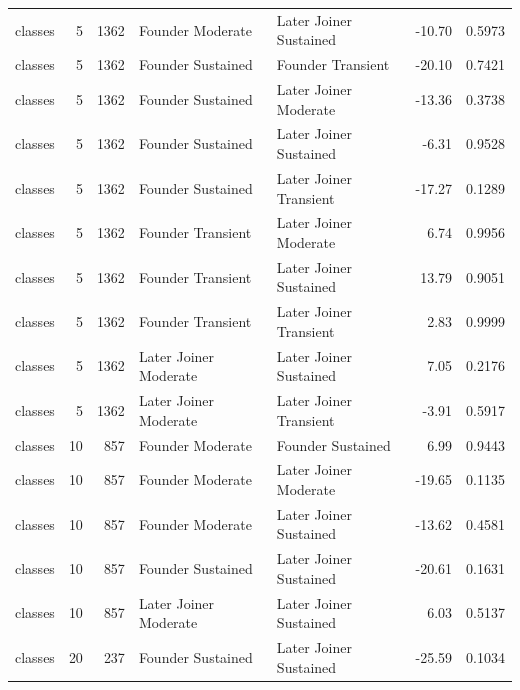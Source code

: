 \begin{table}[H]
{\begin{tabular}{l r r l l r r}
classes & 5 & 1362 & Founder Moderate & Later Joiner Sustained & -10.70 & 0.5973 \\ 
classes & 5 & 1362 & Founder Sustained & Founder Transient & -20.10 & 0.7421 \\ 
classes & 5 & 1362 & Founder Sustained & Later Joiner Moderate & -13.36 & 0.3738 \\ 
classes & 5 & 1362 & Founder Sustained & Later Joiner Sustained & -6.31 & 0.9528 \\ 
classes & 5 & 1362 & Founder Sustained & Later Joiner Transient & -17.27 & 0.1289 \\ 
classes & 5 & 1362 & Founder Transient & Later Joiner Moderate & 6.74 & 0.9956 \\ 
classes & 5 & 1362 & Founder Transient & Later Joiner Sustained & 13.79 & 0.9051 \\ 
classes & 5 & 1362 & Founder Transient & Later Joiner Transient & 2.83 & 0.9999 \\ 
classes & 5 & 1362 & Later Joiner Moderate & Later Joiner Sustained & 7.05 & 0.2176 \\ 
classes & 5 & 1362 & Later Joiner Moderate & Later Joiner Transient & -3.91 & 0.5917 \\ 
classes & 10 & 857 & Founder Moderate & Founder Sustained & 6.99 & 0.9443 \\ 
classes & 10 & 857 & Founder Moderate & Later Joiner Moderate & -19.65 & 0.1135 \\ 
classes & 10 & 857 & Founder Moderate & Later Joiner Sustained & -13.62 & 0.4581 \\ 
classes & 10 & 857 & Founder Sustained & Later Joiner Sustained & -20.61 & 0.1631 \\ 
classes & 10 & 857 & Later Joiner Moderate & Later Joiner Sustained & 6.03 & 0.5137 \\ 
classes & 20 & 237 & Founder Sustained & Later Joiner Sustained & -25.59 & 0.1034 \\ 
\bottomrule
\end{tabular}%
} 
\end{table}
\newpage 
